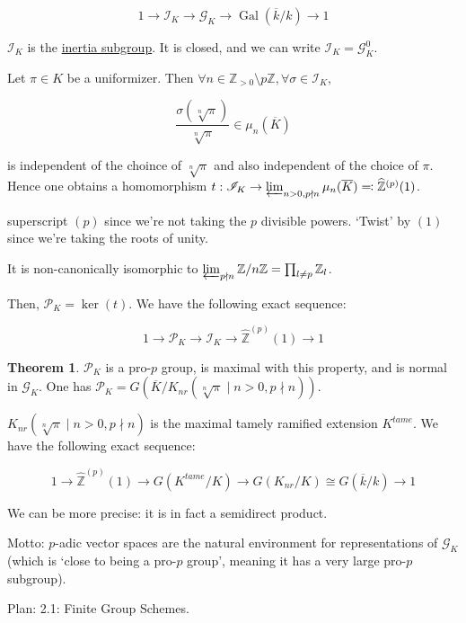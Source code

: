 \documentclass{article}
\theoremstyle{definition}
\newtheorem{theorem}{Theorem}
\numberwithin{theorem}{subsection}
\begin{document}
    \[
        1 \to \mathscr{I}_K \to \mathscr{G}_K \to \operatorname{Gal}(\overline{k} / k) \to 1
    \]

    \(\mathscr{I}_K\) is the \underline{inertia subgroup}. It is closed, and we can write \(\mathscr{I}_K = \mathscr{G}_K^0\).
    
    Let \(\pi \in K\) be a uniformizer. Then \(\forall n\in \mathbb{Z}_{> 0} \setminus p \mathbb{Z}, \forall \sigma \in \mathscr{I}_K,\)

    \[
        \frac{\sigma(\sqrt[n]{\pi})}{\sqrt[n]{\pi}} \in \mu_n(\overline{K})
    \]

    is independent of the choince of \(\sqrt[n]{\pi}\) and also independent of the choice of \(\pi\). Hence one obtains a homomorphism \(t: \mathscr{I}_K \to \varprojlim_{n > 0, p\nmid n} \mu_n(\overline{K}) \eqqcolon \widehat{\mathbb{Z}}^{(p)}(1)\).

    superscript \((p)\) since we're not taking the \(p\) divisible powers. `Twist' by \((1)\) since we're taking the roots of unity.
    
    It is non-canonically isomorphic to \(\varprojlim_{p\nmid n} \mathbb{Z} / n\mathbb{Z} = \prod_{l\neq p} \mathbb{Z} _l\).

    Then, \(\mathscr{P}_K = \ker (t)\). We have the following exact sequence:

    \[
        1 \to \mathscr{P}_K \to \mathscr{I}_K \to \widehat{\mathbb{Z}}^{(p)}(1) \to 1
    \]

    \begin{theorem}
        \(\mathscr{P}_K\) is a pro-\(p\) group, is maximal with this property, and is normal  in \(\mathscr{G}_K\). One has \(\mathscr{P}_K = G(\overline{K} / K_{nr}(\sqrt[n]{\pi} \mid n > 0, p \nmid n))\).
    \end{theorem}

    \(K_{nr}(\sqrt[n]{\pi} \mid n > 0, p \nmid n )\) is the maximal tamely ramified extension \(K^{tame}\). We have the following exact sequence:

    \[
        1 \to \widehat{\mathbb{Z}}^{(p)}(1) \to G(K^{tame} / K) \to G(K_{nr} / K) \cong G(\overline{k} / k) \to 1
    \]

    We can be more precise: it is in fact a semidirect product.

    Motto: \(p\)-adic vector spaces are the natural environment for representations of \(\mathscr{G}_K\) (which is `close to being a pro-\(p\) group', meaning it has a very large pro-\(p\) subgroup).

    Plan: 2.1: Finite Group Schemes.
\end{document}
